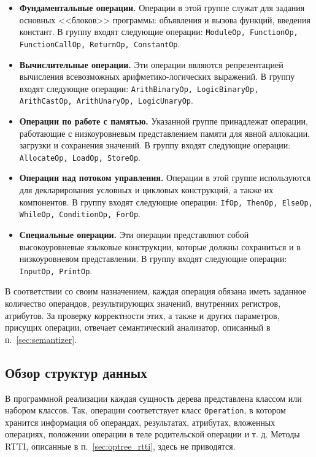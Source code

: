 \begin{itemize}
    \item \textbf{Фундаментальные операции.}
          Операции в этой группе служат для задания основных <<блоков>> программы: объявления и вызова функций, введения констант.
          В группу входят следующие операции:
          \verb|ModuleOp, FunctionOp, FunctionCallOp, ReturnOp, ConstantOp|.
    \item \textbf{Вычислительные операции.}
          Эти операции являются репрезентацией вычисления всевозможных арифметико-логических выражений.
          В группу входят следующие операции:
          \verb|ArithBinaryOp, LogicBinaryOp, ArithCastOp, ArithUnaryOp, LogicUnaryOp|.
    \item \textbf{Операции по работе с памятью.}
          Указанной группе принадлежат операции, работающие с низкоуровневым представлением памяти для явной аллокации, загрузки и сохранения значений.
          В группу входят следующие операции:
          \verb|AllocateOp, LoadOp, StoreOp|.
    \item \textbf{Операции над потоком управления.}
          Операции в этой группе используются для декларирования условных и цикловых конструкций, а также их компонентов.
          В группу входят следующие операции:
          \verb|IfOp, ThenOp, ElseOp, WhileOp, ConditionOp, ForOp|.
    \item \textbf{Специальные операции.}
          Эти операции представляют собой высокоуровневые языковые конструкции, которые должны сохраниться и в низкоуровневом представлении.
          В группу входят следующие операции:
          \verb|InputOp, PrintOp|.
\end{itemize}

В соответствии со своим назначением, каждая операция обязана иметь заданное количество операндов, результирующих значений, внутренних регистров, атрибутов.
За проверку корректности этих, а также и других параметров, присущих операции, отвечает семантический анализатор, описанный в п.~\ref{sec:semantizer}.

\subsection{Обзор структур данных}

В программной реализации каждая сущность дерева представлена классом или набором классов.
Так, операции соответствует класс \verb|Operation|, в котором хранится информация об операндах, результатах, атрибутах, вложенных операциях, положении операции в теле родительской операции и т. д. Методы RTTI, описанные в п.~\ref{sec:optree_rtti}, здесь не приводятся.

